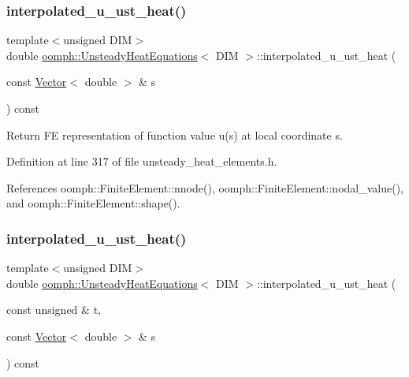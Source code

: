 \subsubsection{\texorpdfstring{interpolated\+\_\+u\+\_\+ust\+\_\+heat()}{interpolated\_u\_ust\_heat()}\hspace{0.1cm}{\footnotesize\ttfamily [1/2]}}
{\footnotesize\ttfamily template$<$unsigned D\+IM$>$ \\
double \hyperlink{classoomph_1_1UnsteadyHeatEquations}{oomph\+::\+Unsteady\+Heat\+Equations}$<$ D\+IM $>$\+::interpolated\+\_\+u\+\_\+ust\+\_\+heat (\begin{DoxyParamCaption}\item[{const \hyperlink{classoomph_1_1Vector}{Vector}$<$ double $>$ \&}]{s }\end{DoxyParamCaption}) const\hspace{0.3cm}{\ttfamily [inline]}}



Return FE representation of function value u(s) at local coordinate s. 



Definition at line 317 of file unsteady\+\_\+heat\+\_\+elements.\+h.



References oomph\+::\+Finite\+Element\+::nnode(), oomph\+::\+Finite\+Element\+::nodal\+\_\+value(), and oomph\+::\+Finite\+Element\+::shape().

\mbox{\label{classoomph_1_1UnsteadyHeatEquations_a267490c49a2e6556ac74e37220882ad3}} 
\subsubsection{\texorpdfstring{interpolated\+\_\+u\+\_\+ust\+\_\+heat()}{interpolated\_u\_ust\_heat()}\hspace{0.1cm}{\footnotesize\ttfamily [2/2]}}
{\footnotesize\ttfamily template$<$unsigned D\+IM$>$ \\
double \hyperlink{classoomph_1_1UnsteadyHeatEquations}{oomph\+::\+Unsteady\+Heat\+Equations}$<$ D\+IM $>$\+::interpolated\+\_\+u\+\_\+ust\+\_\+heat (\begin{DoxyParamCaption}\item[{const unsigned \&}]{t,  }\item[{const \hyperlink{classoomph_1_1Vector}{Vector}$<$ double $>$ \&}]{s }\end{DoxyParamCaption}) const\hspace{0.3cm}{\ttfamily [inline]}}



